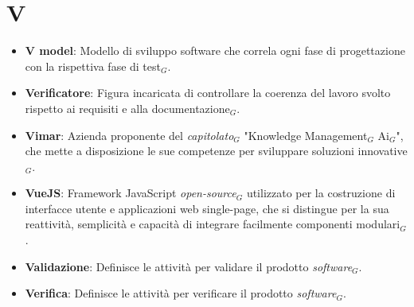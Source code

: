 \section{V}
\begin{itemize}
    \item \textbf{V model}: Modello di sviluppo software che correla ogni fase di progettazione con la rispettiva fase di test$_G$.
    \item \textbf{Verificatore}: Figura incaricata di controllare la coerenza del lavoro svolto rispetto ai requisiti e alla documentazione$_G$.
    \item \textbf{Vimar}: Azienda proponente del \textit{capitolato}$_G$ "Knowledge Management$_G$ Ai$_G$", che mette a disposizione le sue competenze per sviluppare soluzioni innovative$_G$.
    \item \textbf{VueJS}: Framework JavaScript \textit{open-source}$_G$ utilizzato per la costruzione di interfacce utente e applicazioni web single-page, che si distingue per la sua reattività, semplicità e capacità di integrare facilmente componenti modulari$_G$.
    \item \textbf{Validazione}: Definisce le attività per validare il prodotto \textit{software}$_G$.
    \item \textbf{Verifica}: Definisce le attività per verificare il prodotto \textit{software}$_G$.
\end{itemize}
